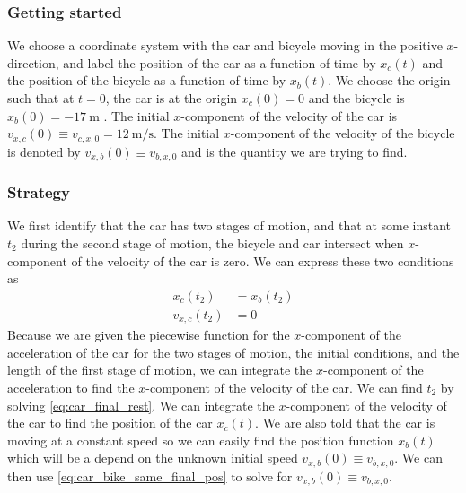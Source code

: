 \documentclass{esg8012exam}
\begin{document}
\begin{solution}
  \subsubsection{Getting started}
    We choose a coordinate system with the car and bicycle moving in the positive $x$-direction, and label the position of the car as a function of time by $x_c(t)$ and the position of the bicycle as a function of time by $x_b(t)$.  We choose the origin such that at $t = 0$, the car is at the origin $x_c(0) = 0$ and the bicycle is $x_b(0) = -\SI{17}{\meter}$
.  The initial $x$-component of the velocity of the car is $v_{x,c}(0) \equiv v_{c,x,0} = \SI{12}{\meter\per\second}$.  The initial $x$-component of the velocity of the bicycle is denoted by $v_{x,b}(0) \equiv v_{b,x,0}$ and is the quantity we are trying to find.
  \subsubsection{Strategy}
    We first identify that the car has two stages of motion, and that at some instant $t_2$ during the second stage of motion, the bicycle and car intersect when $x$-component of the velocity of the car is zero. We can express these two conditions as
    \begin{align}
      x_c(t_2) & = x_b(t_2) \label{eq:car_bike_same_final_pos}\\
      v_{x,c}(t_2) & = 0 \label{eq:car_final_rest}
    \end{align}
    Because we are given the piecewise function for the $x$-component of the acceleration of the car for the two stages of motion, the initial conditions, and the length of the first stage of motion, we can integrate the $x$-component of the acceleration to find the $x$-component of the velocity of the car.  We can find $t_2$ by solving \autoref{eq:car_final_rest}.  We can integrate the $x$-component of the velocity of the car to find the position of the car $x_c(t)$.  We are also told that the car is moving at a constant speed so we can easily find the position function $x_b(t)$ which will be a depend on the unknown initial speed $v_{x,b}(0) \equiv v_{b,x,0}$.  We can then use \autoref{eq:car_bike_same_final_pos} to solve for $v_{x,b}(0) \equiv v_{b,x,0}$.

\end{solution}
\end{document}
